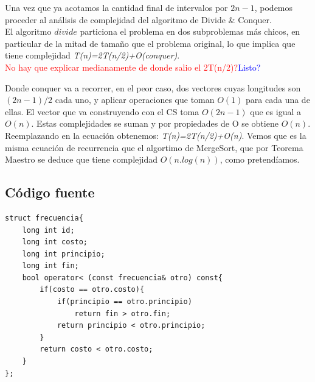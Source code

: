 Una vez que ya acotamos la cantidad final de intervalos por $2n-1$, podemos proceder al an\'alisis de complejidad del algoritmo de Divide \& Conquer.\\

El algoritmo $divide$ particiona el problema en dos subproblemas m\'as chicos, en particular de la mitad de tamaño que el problema original, lo que implica que tiene complejidad \emph{T(n)=2T(n/2)+O(conquer)}.\\
\textcolor{red}{No hay que explicar medianamente de donde salio el 2T(n/2)?}\textcolor{blue}{Listo?}

Donde conquer va a recorrer, en el peor caso, dos vectores cuyas longitudes son $(2n-1)/2$ cada uno, y aplicar operaciones que toman $O(1)$ para cada una de ellas. El vector que va construyendo con el CS toma $O(2n-1)$ que es igual a $O(n)$. Estas complejidades se suman y por propiedades de O se obtiene $O(n)$.\\

Reemplazando en la ecuaci\'on obtenemos: \emph{T(n)=2T(n/2)+O(n)}. Vemos que es la misma ecuaci\'on de recurrencia que el algortimo de MergeSort, que por Teorema Maestro se deduce que tiene complejidad $O(n.log(n))$, como pretend\'iamos.

\newpage
\subsection{C\'odigo fuente}



	\begin{codesnippet}
	\begin{verbatim}
struct frecuencia{
    long int id;
    long int costo;
    long int principio;
    long int fin;
    bool operator< (const frecuencia& otro) const{
        if(costo == otro.costo){
            if(principio == otro.principio)
                return fin > otro.fin;
            return principio < otro.principio;
        }
        return costo < otro.costo;
    }
};
	\end{verbatim}
	\end{codesnippet}
	
